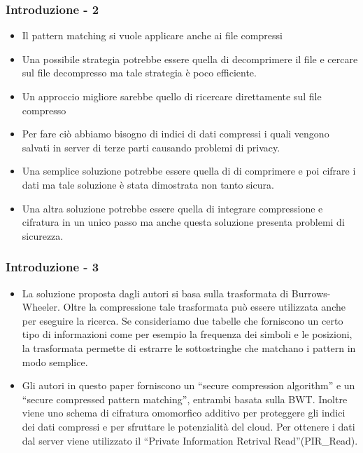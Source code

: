 \documentclass{beamer}
\begin{document}
\begin{frame}
\frametitle{Introduzione - 2}
	\begin{itemize}
		\item Il pattern matching si vuole applicare anche ai file compressi
		\pause
		\item Una possibile strategia potrebbe essere quella di decomprimere il file e cercare sul file decompresso ma tale strategia è poco efficiente.
		\pause
		\item Un approccio migliore sarebbe quello di ricercare direttamente sul file compresso \pause
		\item Per fare ciò abbiamo bisogno di indici di dati compressi i quali vengono salvati in server di terze parti causando problemi di privacy. 
		\pause
		\item Una semplice soluzione potrebbe essere quella di di comprimere e poi cifrare i dati ma tale soluzione è stata dimostrata non tanto sicura.
		\pause
		\item Una altra soluzione potrebbe essere quella di integrare compressione e cifratura in un unico passo ma anche questa soluzione presenta problemi di sicurezza.
		
	\end{itemize}
\end{frame}

\begin{frame}
\frametitle{Introduzione - 3}
	\begin{itemize}
		\item La soluzione proposta dagli autori si basa sulla trasformata di Burrows-Wheeler. Oltre la compressione tale trasformata può essere utilizzata anche per eseguire la ricerca. Se consideriamo due tabelle che forniscono un certo tipo di informazioni come per esempio la frequenza dei simboli e le posizioni, la trasformata permette di estrarre le sottostringhe che matchano i pattern in modo semplice.
		\pause
		\item Gli autori in questo paper forniscono un ``secure compression algorithm'' e un “secure compressed pattern matching”, entrambi basata sulla BWT. Inoltre viene uno schema di cifratura omomorfico additivo per proteggere gli indici dei dati compressi e per sfruttare le potenzialità del cloud. Per ottenere i dati dal server viene utilizzato il ``Private Information Retrival Read''(PIR\_Read).
		
	\end{itemize}
\end{frame}
\end{document}
